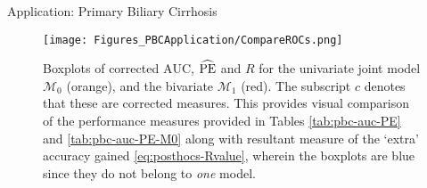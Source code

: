 \begin{chapter}{\label{cha:app-PBC}Application: Primary Biliary Cirrhosis}

  \begin{figure}
      \centering
      \texttt{[image: Figures\_PBCApplication/CompareROCs.png]}
      \caption{Boxplots of corrected $\mathrm{AUC}$, $\widehat{\mathrm{PE}}$ and $R$ for the univariate joint model $\mathcal{M}_0$ (orange), and the bivariate $\mathcal{M}_1$ (red). The subscript $c$ denotes that these are corrected measures. This provides visual comparison of the performance measures provided in Tables \ref{tab:pbc-auc-PE} and \ref{tab:pbc-auc-PE-M0} along with resultant measure of the `extra' accuracy gained \eqref{eq:posthocs-Rvalue}, wherein the boxplots are blue since they do not belong to \textit{one} model.}
      \label{fig:pbc-compare-roc}
  \end{figure}

\end{chapter}